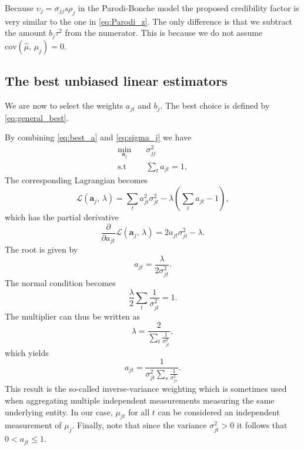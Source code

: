 \documentclass[11pt]{article}
\theoremstyle{definition}
\begin{document}
Because $\upsilon_j = \sigma_{jj} s \rho_j$ in the Parodi-Bonche model the proposed credibility factor is very similar to the one in \eqref{eq:Parodi_z}. The only difference is that we subtract the amount $b_j\tau^2$ from the numerator. This is because we do not assume $\text{cov}(\hat\mu,\, \mu_j) = 0$.

\subsection{The best unbiased linear estimators}
We are now to select the weights $a_{jt}$ and $b_j$. The best choice is defined by \eqref{eq:general_best}.

By combining \eqref{eq:best_a} and \eqref{eq:sigma_j} we have
\begin{equation*}
    \begin{aligned}
        \underset{\bm a_j}{\min} &\quad \sigma_{jj}^2 \\
        \text{s.t} &\quad \sum_t a_{jt} = 1,
    \end{aligned}
\end{equation*}
The corresponding Lagrangian becomes
\begin{equation*}
    \mathcal{L}(\bm a_j,\, \lambda) = \sum_t a_{jt}^2\sigma_{jt}^2 - \lambda (\sum_t a_{jt}-1),
\end{equation*}
which has the partial derivative
\begin{equation*}
\frac{\partial}{\partial a_{jt}} \mathcal{L}(\bm a_j,\, \lambda) = 2a_{jt}\sigma_{jt}^2 - \lambda.
\end{equation*}
The root is given by
\begin{equation*}
    a_{jt} = \frac{\lambda}{2\sigma_{jt}^2}.
\end{equation*}
The normal condition becomes
\begin{equation*}
    \frac{\lambda}{2} \sum_t \frac{1}{\sigma_{jt}^2} = 1.
\end{equation*}
The multiplier can thus be written as
\begin{equation*}
    \lambda = \frac{2}{\sum_t \frac{1}{\sigma_{jt}^2}},
\end{equation*}
which yields
\begin{equation}\label{eq:a_jt}
    a_{jt} = \frac{1}{\sigma_{jt}^2\sum_s \frac{1}{\sigma_{js}^2}}.
\end{equation}
This result is the so-called inverse-variance weighting which is sometimes used when aggregating multiple independent measurements measuring the same underlying entity. In our case, $\mu_{jt}$ for all $t$ can be considered an independent measurement of $\mu_j$. Finally, note that since the variance $\sigma_{jt}^2 > 0$ it follows that $0<a_{jt}\leq 1$.
\end{document}
